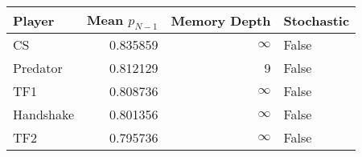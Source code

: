 \begin{tabular}{lrrl}
\toprule
    Player &  Mean $p_{N-1}$ &  Memory Depth & Stochastic \\
\midrule
        CS &        0.835859 &            \(\infty\) &      False \\
  Predator &        0.812129 &             9 &      False \\
       TF1 &        0.808736 &            \(\infty\) &      False \\
 Handshake &        0.801356 &            \(\infty\) &      False \\
       TF2 &        0.795736 &            \(\infty\) &      False \\
\bottomrule
\end{tabular}
